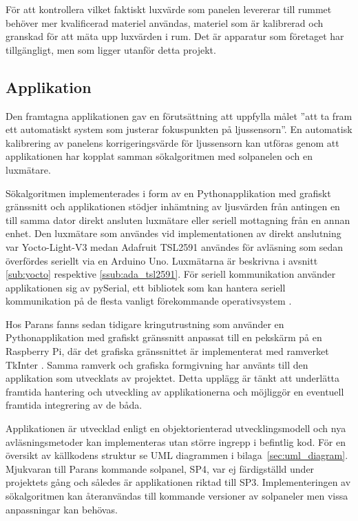             För att kontrollera vilket faktiskt luxvärde som panelen levererar till rummet behöver mer kvalificerad materiel användas, materiel som är kalibrerad och granskad för att mäta upp luxvärden i rum. Det är apparatur som företaget har tillgängligt, men som ligger utanför detta projekt.

    \subsection{Applikation} %
    \label{sub:applikation}
        Den framtagna applikationen gav en förutsättning att uppfylla målet ''att ta fram ett automatiskt system som justerar fokuspunkten på ljussensorn''. En automatisk kalibrering av panelens korrigeringsvärde för ljussensorn kan utföras genom att applikationen har kopplat samman sökalgoritmen med solpanelen och en luxmätare.\bigskip

        Sökalgoritmen implementerades i form av en Pythonapplikation med grafiskt gränssnitt och applikationen stödjer inhämtning av ljusvärden från antingen en till samma dator direkt ansluten luxmätare eller seriell mottagning från en annan enhet. Den luxmätare som användes vid implementationen av direkt anslutning var Yocto-Light-V3 medan Adafruit TSL2591 användes för avläsning som sedan överfördes seriellt via en Arduino Uno. Luxmätarna är beskrivna i avsnitt \ref{sub:yocto} respektive \ref{ssub:ada_tsl2591}. För seriell kommunikation använder applikationen sig av pySerial, ett bibliotek som kan hantera seriell kommunikation på de flesta vanligt förekommande operativsystem \cite{pyserial}. \bigskip

        Hos Parans fanns sedan tidigare kringutrustning som använder en Pythonapplikation med grafiskt gränssnitt anpassat till en pekskärm på en Raspberry Pi, där det grafiska gränssnittet är implementerat med ramverket TkInter \cite{solarremote}. Samma ramverk och grafiska formgivning har använts till den applikation som utvecklats av projektet. Detta upplägg är tänkt att underlätta framtida hantering och utveckling av applikationerna och möjliggör en eventuell framtida integrering av de båda. \bigskip

        Applikationen är utvecklad enligt en objektorienterad utvecklingsmodell och nya avläsningsmetoder kan implementeras utan större ingrepp i befintlig kod. För en översikt av källkodens struktur se UML diagrammen i bilaga~\ref{sec:uml_diagram}. Mjukvaran till Parans kommande solpanel, SP4, var ej färdigställd under projektets gång och således är applikationen riktad till SP3. Implementeringen av sökalgoritmen kan återanvändas till kommande versioner av solpaneler men vissa anpassningar kan behövas.
